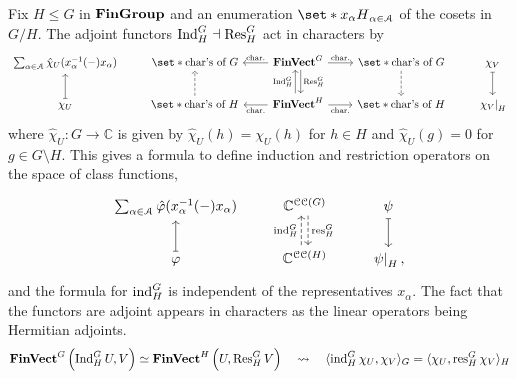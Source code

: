 \begin{theorem}
\label{result:frobenius-reciprocity}
  \pan Fix $H \leq G$ in $\operatorname{\mathbf{FinGroup}}$ and an enumeration $\set*{x_{\alpha} H}_{\alpha \in \mathcal{A}}$ of the cosets in $G / H$. The adjoint functors $\operatorname{Ind}_H^G \dashv \operatorname{Res}^G_H$ act in characters by
  \begin{align*}
    \begin{tikzcd}[ampersand replacement = \;, column sep = 2.2em]
      \sum_{\alpha \in \mathcal{A}} \hat{\chi}_U (x_{\alpha}^{-1} (\blank) x_{\alpha})
      \; \set*{\text{char's of } G}
      \; \FinVect^G
        \arrow[d, shift left, "\Res^G_H"]
        \arrow[r, "\text{char.}"]
        \arrow[l, "\text{char.}"']
      \; \set*{\text{char's of } G}
        \arrow[d, dashed]
      \; \chi_V
        \arrow[d, mapsto]
      \\
      \chi_U
        \arrow[u, mapsto]
      \; \set*{\text{char's of } H}
        \arrow[u, dashed]
      \; \FinVect^H
        \arrow[u, shift left, "\Ind_H^G"]
        \arrow[r, "\text{char.}"']
        \arrow[l, "\text{char.}"]
      \; \set*{\text{char's of } H}
      \; \restrict{\chi_V}_{H}
    \end{tikzcd}
  \end{align*}
  where $\hat{\chi}_U : G \to \mathbb{C}$ is given by $\hat{\chi}_U (h) = \chi_U (h)$ for $h \in H$ and $\hat{\chi}_U (g) = 0$ for $g \in G \setminus H$. This gives a formula to define induction and restriction operators on the space of class functions,
  \begin{align*}
    \begin{tikzcd}[ampersand replacement = \;]
      \sum_{\alpha \in \mathcal{A}} \hat{\varphi} (x_{\alpha}^{-1} (\blank) x_{\alpha})
      \; \mathbb{C}^{\Classes(G)}
        \arrow[d, shift left, dashed, "\res^G_H"]
      \; \psi
        \arrow[d, mapsto]
      \\
      \varphi
        \arrow[u, mapsto]
      \; \mathbb{C}^{\Classes(H)}
        \arrow[u, shift left, dashed, "\ind_H^G"]
      \; \restrict{\psi}_{H}
      ,
    \end{tikzcd}
  \end{align*}
  and the formula for $\operatorname{ind}^G_H$ is independent of the representatives $x_{\alpha}$. The fact that the functors are adjoint appears in characters as the linear operators being Hermitian adjoints.
  \begin{align*}
    \operatorname{\mathbf{FinVect}}^G \left(
      \operatorname{Ind}^G_H U
    , V
    \right)
    \simeq \operatorname{\mathbf{FinVect}}^H \left(
      U
    , \operatorname{Res}^G_H V
    \right)
    \quad\rightsquigarrow\quad
    \langle \operatorname{ind}_H^G \chi_U, \chi_V \rangle_{G}
    = \langle \chi_U, \operatorname{res}^G_H \chi_V \rangle_{H}
  \end{align*}
\end{theorem}
